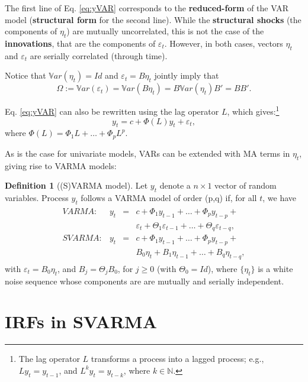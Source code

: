 \documentclass[
  12pt,
]{book}
\theoremstyle{definition}
\newtheorem{definition}{Definition}[chapter]
\theoremstyle{definition}
\theoremstyle{definition}
\theoremstyle{definition}
\theoremstyle{remark}
\begin{document}
The first line of Eq. \eqref{eq:yVAR} corresponds to the \textbf{reduced-form} of the VAR model (\textbf{structural form} for the second line). While the \textbf{structural shocks} (the components of \(\eta_t\)) are mutually uncorrelated, this is not the case of the \textbf{innovations}, that are the components of \(\varepsilon_t\). However, in both cases, vectors \(\eta_t\) and \(\varepsilon_t\) are serially correlated (through time).

Notice that \(\mathbb{V}ar(\eta_t)=Id\) and \(\varepsilon_t = B\eta_t\) jointly imply that \[
\Omega :=\mathbb{V}ar(\varepsilon_t)=\mathbb{V}ar(B\eta_t)= B  \mathbb{V}ar(\eta_t) B'=BB'.
\]

Eq. \eqref{eq:yVAR} can also be rewritten using the lag operator \(L\), which gives:\footnote{The lag operator \(L\) transforms a process into a lagged process; e.g., \(L y_t = y_{t-1}\), and \(L^k y_t = y_{t-k}\), where \(k \in \mathbb{N}\).}
\[
y_t = c + \Phi(L) y_{t} + \varepsilon_t,
\]
where \(\Phi(L)=\Phi_1 L + \dots + \Phi_p L^p\).

As is the case for univariate models, VARs can be extended with MA terms in \(\eta_t\), giving rise to VARMA models:

\begin{definition}[(S)VARMA model]
\protect\hypertarget{def:SVARMA}{}\label{def:SVARMA}Let \(y_{t}\) denote a \(n \times1\) vector of random variables. Process \(y_{t}\) follows a VARMA model of order (p,q) if, for all \(t\), we have
\begin{eqnarray}
\begin{array}{rllll}
VARMA:& y_t &=& c + \Phi_1 y_{t-1} + \dots + \Phi_p y_{t-p} + \\
&&&\varepsilon_t + \Theta_1\varepsilon_{t-1} + \dots + \Theta_q \varepsilon_{t-q},\\
SVARMA:& y_t &=& c + \Phi_1 y_{t-1} + \dots + \Phi_p y_{t-p} + \\
&&& B_0 \eta_t + B_1 \eta_{t-1} + \dots +  B_q \eta_{t-q},
\end{array}
\label{eq:yVARMA}
\end{eqnarray}
with \(\varepsilon_t = B_0\eta_t\), and \(B_j = \Theta_j B_0\), for \(j \ge 0\) (with \(\Theta_0=Id\)), where \(\{\eta_{t}\}\) is a white noise sequence whose components are are mutually and serially independent.
\end{definition}

\section{IRFs in SVARMA}\label{IRFSVARMA}
\end{document}
